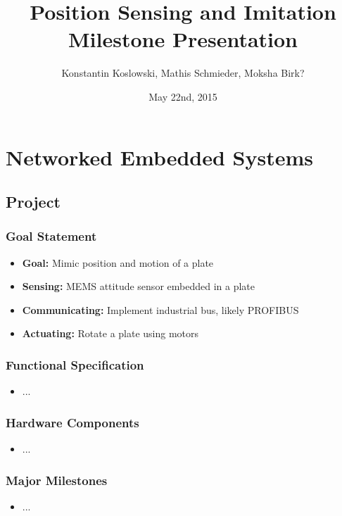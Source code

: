 \documentclass{beamer}
\title[NES Project: Milestone Presentation]{Position Sensing and Imitation\\Milestone Presentation}
\author[Koslowski, Schmieder, Birk?]{Konstantin Koslowski, Mathis Schmieder, Moksha Birk?}
\institute[]
{TU Berlin \\
 Department of Telecommunication Systems \\
 Telecommunication Networks Group \\
}
\date{May 22nd, 2015}
\begin{document}
\begin{frame}
  \titlepage
\end{frame}

\section{Networked Embedded Systems}
\subsection{Project}

\begin{frame}
  \frametitle{Goal Statement}
	\begin{itemize}
		\item \textbf{Goal:} Mimic position and motion of a plate
		\vfill
		\item \textbf{Sensing:} MEMS attitude sensor embedded in a plate
		\item \textbf{Communicating:} Implement industrial bus, likely PROFIBUS
		\item \textbf{Actuating:} Rotate a plate using motors
	\end{itemize}
\end{frame}

\begin{frame}
  \frametitle{Functional Specification}
	\begin{itemize}
		\item ...
	\end{itemize}
\end{frame}

\begin{frame}
  \frametitle{Hardware Components}
	\begin{itemize}
		\item ...
	\end{itemize}
\end{frame}

\begin{frame}
  \frametitle{Major Milestones}
	\begin{itemize}
		\item ...
	\end{itemize}
\end{frame}
\end{document}
